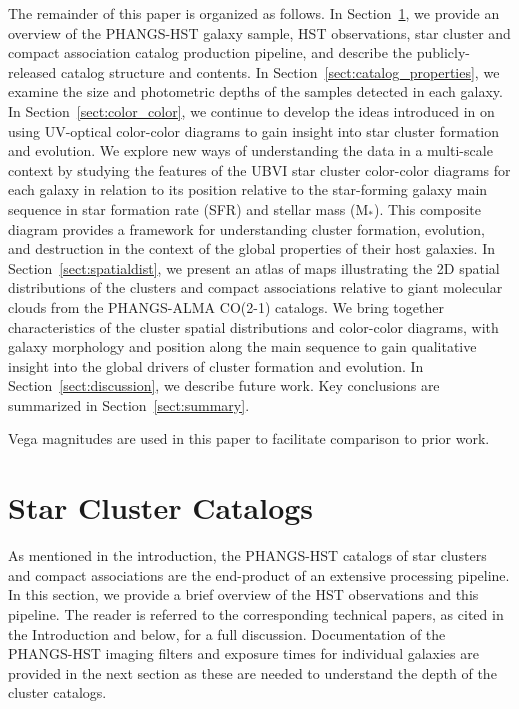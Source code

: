 \documentclass[linenumbers]{aastex63}
\begin{document}
The remainder of this paper is organized as follows. In Section~\ref{sect:catalog_content}, we provide an overview of the PHANGS-HST galaxy sample, HST observations, star cluster and compact association catalog production pipeline, and describe the publicly-released catalog structure and contents.  In Section~\ref{sect:catalog_properties}, we examine the size and photometric depths of the samples detected in each galaxy.  In Section~\ref{sect:color_color}, we continue to develop the ideas introduced in \cite{lee23ubvi} on using UV-optical color-color diagrams to gain insight into star cluster formation and evolution.  We explore new ways of understanding the data in a multi-scale context by studying the features of the UBVI star cluster color-color diagrams for each galaxy in relation to its position relative to the star-forming galaxy main sequence in star formation rate (SFR) and stellar mass (M$_*$).  This composite diagram provides a framework for understanding cluster formation, evolution, and destruction in the context of the global properties of their host galaxies.  In Section~\ref{sect:spatialdist}, we present an atlas of maps illustrating the 2D spatial distributions of the clusters and compact associations relative to giant molecular clouds from the PHANGS-ALMA CO(2-1) catalogs.  We bring together characteristics of the cluster spatial distributions and color-color diagrams, with galaxy morphology and position along the main sequence to gain qualitative insight into the global drivers of cluster formation and evolution.  In Section~\ref{sect:discussion}, we describe future work.  Key conclusions are summarized in Section~\ref{sect:summary}.

Vega magnitudes are used in this paper to facilitate comparison to prior work.

\section{Star Cluster Catalogs}\label{sect:catalog_content}
As mentioned in the introduction, the PHANGS-HST catalogs of star clusters and compact associations are the end-product of an extensive processing pipeline.  In this section, we provide a brief overview of the HST observations and this pipeline.  The reader is referred to the corresponding technical papers, as cited in the Introduction and below, for a full discussion.  Documentation of the PHANGS-HST imaging filters and exposure times for individual galaxies are provided in the next section as these are needed to understand the depth of the cluster catalogs.  
\end{document}
